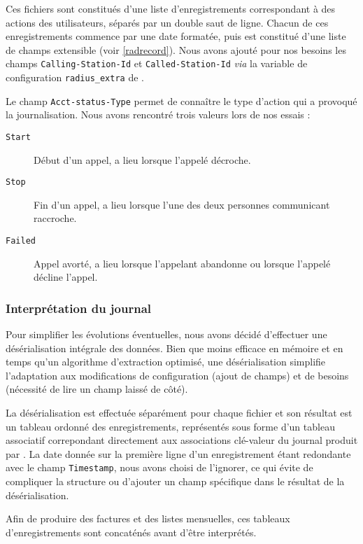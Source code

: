 Ces fichiers sont constitués d’une liste d’enregistrements correspondant à des actions des utilisateurs, séparés par un double saut de ligne. Chacun de ces enregistrements commence par une date formatée, puis est constitué d’une liste de champs extensible (voir \cref{radrecord}). Nous avons ajouté pour nos besoins les champs \texttt{Calling-Station-Id} et \texttt{Called-Station-Id} \textit{via} la variable de configuration \texttt{radius\_extra} de {\kam}.

Le champ \texttt{Acct-status-Type} permet de connaître le type d’action qui a provoqué la journalisation. Nous avons rencontré trois valeurs lors de nos essais :
\begin{description}
	\item[\texttt{Start}] Début d’un appel, a lieu lorsque l’appelé décroche.
	\item[\texttt{Stop}] Fin d’un appel, a lieu lorsque l’une des deux personnes communicant raccroche.
	\item[\texttt{Failed}] Appel avorté, a lieu lorsque l’appelant abandonne ou lorsque l’appelé décline l’appel.
\end{description}

\subsubsection{Interprétation du journal}

Pour simplifier les évolutions éventuelles, nous avons décidé d’effectuer une désérialisation intégrale des données. Bien que moins efficace en mémoire et en temps qu’un algorithme d’extraction optimisé, une désérialisation simplifie l’adaptation aux modifications de configuration (ajout de champs) et de besoins (nécessité de lire un champ laissé de côté).

La désérialisation est effectuée séparément pour chaque fichier et son résultat est un tableau ordonné des enregistrements, représentés sous forme d’un tableau associatif correpondant directement aux associations clé-valeur du journal produit par {\frad}. La date donnée sur la première ligne d’un enregistrement étant redondante avec le champ \texttt{Timestamp}, nous avons choisi de l’ignorer, ce qui évite de compliquer la structure ou d’ajouter un champ spécifique dans le résultat de la désérialisation.

Afin de produire des factures et des listes mensuelles, ces tableaux d’enregistrements sont concaténés avant d’être interprétés.

\newpage

